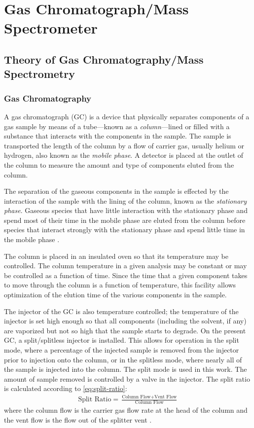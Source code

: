 \documentclass[../main.tex]{subfiles}
\begin{document}
\section{Gas Chromatograph/Mass Spectrometer}
\label{sec:gcms}

\subsection{Theory of Gas Chromatography/Mass Spectrometry}
\label{sec:gcms-theory}

\subsubsection{Gas Chromatography}

A gas chromatograph (GC) is a device that physically separates components
of a gas sample by means of a tube---known as a \textit{column}---lined or filled
with a substance that interacts with the components in the sample. The sample
is transported the length of the column by a flow of carrier gas, usually
helium or hydrogen, also known as the \textit{mobile phase}. A detector is
placed at the outlet of the column to measure the amount and type
of components eluted from the column.

The separation of the gaseous components in the sample is effected by
the interaction of the sample with the lining of the column, known as the
\textit{stationary phase}. Gaseous species that have little interaction with
the stationary phase and spend most of their time in the mobile phase
are eluted from the column before species that interact strongly with
the stationary phase and spend little time in the mobile phase \cite{Sparkman2011a}.

The column is placed in an insulated oven so that its temperature may be
controlled. The column temperature in a given analysis may be constant
or may be controlled as a function of time. Since the time that a given
component takes to move through the column is a function of temperature,
this facility allows optimization of the elution time of the various
components in the sample.

The injector of the GC is also temperature controlled; the temperature of
the injector is set high enough so that all components (including the solvent,
if any) are vaporized but not so high that the sample starts to degrade. On the present GC,
a split/splitless injector is installed. This allows for operation in the
split mode, where a percentage of the injected sample is removed from the
injector prior to injection onto the column, or in the splitless mode,
where nearly all of the sample is injected into the column. The split mode
is used in this work. The amount of sample removed is controlled by a valve
in the injector. The split ratio is calculated according to \cref{eq:split-ratio}:
%
\begin{gather}
\label{eq:split-ratio}
\text{Split Ratio} = \frac{\text{Column Flow} +\text{Vent Flow}}{\text{Column Flow}}
\end{gather}
%
where the column flow is the carrier gas flow rate at the head of the column
and the vent flow is the flow out of the splitter vent \cite{Sparkman2011a}.
\end{document}

